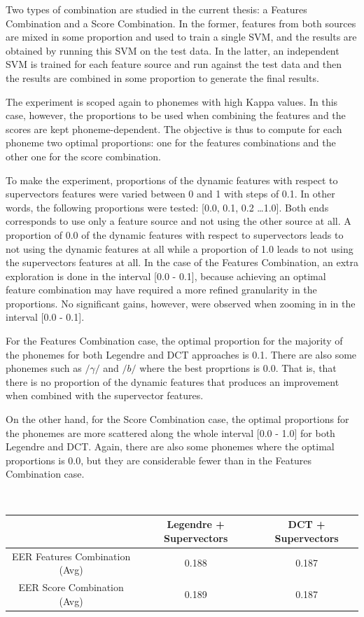Two types of combination are studied in the current thesis: a Features Combination and a Score
Combination. In the former, features from both sources are mixed in some proportion and
used to train a single SVM, and the results are obtained by running this SVM on the test data.
In the latter, an independent SVM is trained for each feature source and run against the
test data and then the results are combined in some proportion to generate the final results.

The experiment is scoped again to phonemes with high Kappa values. In this case, however, the
proportions to be used when combining the features and the scores are kept phoneme-dependent.
The objective is thus to compute for each phoneme two optimal proportions:
one for the features combinations and the other one for the score combination.

To make the experiment, proportions of the dynamic features with respect to supervectors
features were varied between 0 and 1 with steps of 0.1. In other words, the following
proportions were tested: [0.0, 0.1, 0.2 \ldots 1.0]. Both ends corresponds to use only
a feature source and not using the other source at all. A proportion of 0.0 of the dynamic
features with respect to supervectors leads to not using the dynamic features at all while
a proportion of 1.0 leads to not using the supervectors features at all.
In the case of the Features Combination, an extra exploration is done in the interval
[0.0 - 0.1], because achieving an optimal feature combination may have required a more
refined granularity in the proportions. No significant gains, however, were observed
when zooming in in the interval [0.0 - 0.1].

For the Features Combination case, the optimal proportion for the majority of the phonemes
for both Legendre and DCT approaches is 0.1. There are also some phonemes such as
$/\gamma/$ and $/b/$ where the best proprtions is 0.0. That is, that there is no
proportion of the dynamic features that produces an improvement when combined with the
supervector features.

On the other hand, for the Score Combination case, the optimal proportions for
the phonemes are more scattered along the whole interval [0.0 - 1.0] for both Legendre and
DCT. Again, there are also some phonemes where the optimal proportions is 0.0, but they are
considerable fewer than in the Features Combination case.

~

\begin{center}
    \begin{tabular}{ | c | c | c | }
    \hline
    & Legendre + Supervectors & DCT + Supervectors \\ \hline
    EER Features Combination (Avg) & 0.188 & 0.187 \\ \hline
    EER Score Combination (Avg) & 0.189  & 0.187 \\ \hline
    \end{tabular}
\end{center}

